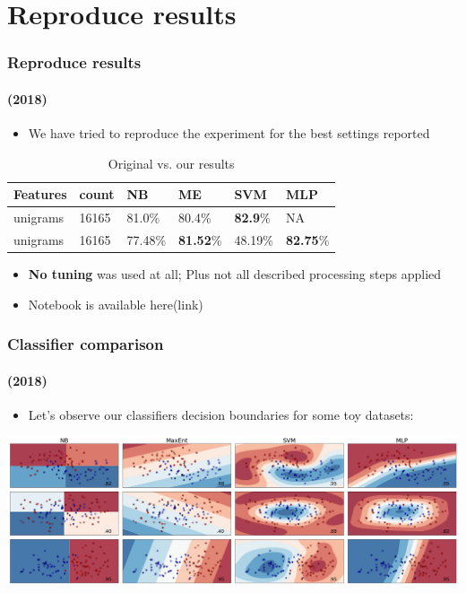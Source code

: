 \documentclass{beamer}
\begin{document}
\section{Reproduce results}
\begin{frame}
	\frametitle{Reproduce results}
	\framesubtitle{(2018)}
	\begin{itemize}
		\item We have tried to reproduce the experiment for the best settings reported
	\end{itemize}
	\begin{center}
		\begin{table}
			\begin{tabular}{l | l | l || l | l | l}
				Features & count & NB & ME & SVM & MLP\\ \hline \hline
				unigrams & 16165 & 81.0\% & 80.4\% & \textbf{82.9}\% & NA \pause \\
				unigrams & 16165 & 77.48\% & \textbf{81.52}\% & 48.19\% & \textbf{82.75}\%  \\
			\end{tabular}
			\caption{Original vs. our results}
		\end{table}
	\end{center} \pause
	\begin{itemize}
		\item \textbf{No tuning} was used at all; Plus not all described processing steps applied 
		\item Notebook is available here(link)
	\end{itemize}
\end{frame}

\begin{frame}
	\frametitle{Classifier comparison}
	\framesubtitle{(2018)}
	\begin{itemize}
		\item Let's observe our classifiers decision boundaries for some toy datasets: \pause
	\end{itemize}
	\begin{center}
		\includegraphics[scale=0.26]{comparison}
	\end{center}
	
\end{frame}
\end{document}
